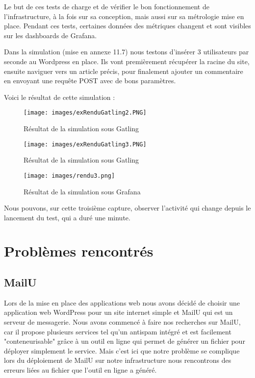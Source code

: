 \documentclass[oneside,12pt]{report}
\begin{document}
Le but de ces tests de charge et de vérifier le bon fonctionnement de l'infrastructure, à la fois sur sa conception, mais aussi sur sa métrologie mise en place. Pendant ces tests, certaines données des métriques changent et sont visibles sur les dashboards de Grafana.\newline

Dans la simulation (mise en annexe 11.7) nous testons d'insérer 3 utilisateurs par seconde au Wordpress en place. Ils vont premièrement récupérer la racine du site, ensuite naviguer vers un article précis, pour finalement ajouter un commentaire en envoyant une requête POST avec de bons paramètres.\newline

Voici le résultat de cette simulation :

\begin{figure}[H]
    \centering
    \texttt{[image: images/exRenduGatling2.PNG]}
    \caption{Résultat de la simulation sous Gatling}
    \label{fig:mesh1}
\end{figure}

\begin{figure}[H]
    \centering
    \texttt{[image: images/exRenduGatling3.PNG]}
    \caption{Résultat de la simulation sous Gatling}
    \label{fig:mesh1}
\end{figure}

\begin{figure}[H]
    \centering
    \texttt{[image: images/rendu3.png]}
    \caption{Résultat de la simulation sous Grafana}
    \label{fig:mesh1}
\end{figure}
Nous pouvons, sur cette troisième capture, observer l'activité qui change depuis le lancement du test, qui a duré une minute.

\section{Problèmes rencontrés}

\subsection{MailU}

Lors de la mise en place des applications web nous avons décidé de choisir une application web WordPress pour un site internet simple et MailU qui est un serveur de messagerie. Nous avons commencé à faire nos recherches sur MailU, car il propose plusieurs services tel qu'un antispam intégré et est facilement "conteneurisable" grâce à un outil en ligne qui permet de générer un fichier pour déployer simplement le service. Mais c'est ici que notre problème se complique lors du déploiement de MailU sur notre infrastructure nous rencontrons des erreurs liées au fichier que l'outil en ligne a généré.
\newline
\end{document}
